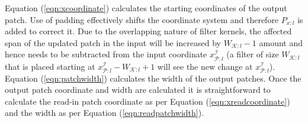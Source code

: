 


Equation (\ref{eqn:xcoordinate}) calculates the starting coordinates of the output patch.
Use of padding effectively shifts the coordinate system and therefore $P_{x:l}$ is added to correct it.
Due to the overlapping nature of filter kernels, the affected span of the updated patch in the input will be increased by $W_{\mathcal{K}:l}-1$ amount and hence needs to be subtracted from the input coordinate $x^\mathcal{I}_{\mathcal{P}:l}$ (a filter of size $W_{\mathcal{K}:l}$ that is placed starting at $x^\mathcal{I}_{\mathcal{P}:l} - W_{\mathcal{K}:l} + 1$ will see the new change at $x^\mathcal{I}_{\mathcal{P}:l}$).
Equation (\ref{eqn:patchwidth}) calculates the width of the output patches.
Once the output patch coordinate and width are calculated it is straightforward to calculate the read-in patch coordinate as per Equation (\ref{eqn:xreadcoordinate}) and the width as per Equation (\ref{eqn:readpatchwidth}).


